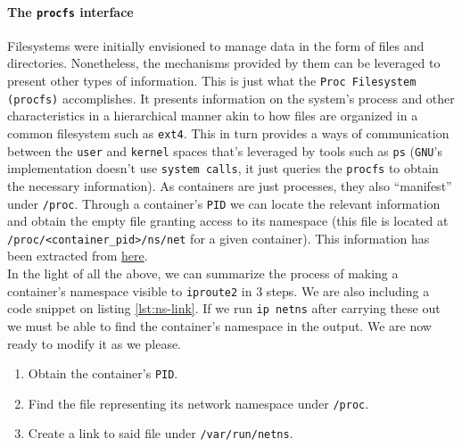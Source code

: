                 \paragraph{The \texttt{procfs} interface}
                    Filesystems were initially envisioned to manage data in the form of files and directories. Nonetheless, the mechanisms provided by them can be leveraged to present other types of information. This is just what the \texttt{Proc Filesystem (procfs)} accomplishes. It presents information on the system's process and other characteristics in a hierarchical manner akin to how files are organized in a common filesystem such as \texttt{ext4}. This in turn provides a ways of communication between the \texttt{user} and \texttt{kernel} spaces that's leveraged by tools such as \texttt{ps} (\texttt{GNU}'s implementation doesn't use \texttt{system calls}, it just queries the \texttt{procfs} to obtain the necessary information). As containers are just processes, they also ``manifest'' under \texttt{/proc}. Through a container's \texttt{PID} we can locate the relevant information and obtain the empty file granting access to its namespace (this file is located at \texttt{/proc/<container\_pid>/ns/net} for a given container). This information has been extracted from \href{https://en.wikipedia.org/wiki/Procfs}{here}.\\

                In the light of all the above, we can summarize the process of making a container's namespace visible to \texttt{iproute2} in $3$ steps. We are also including a code snippet on listing \ref{lst:ns-link}. If we run \texttt{ip netns} after carrying these out we must be able to find the container's namespace in the output. We are now ready to modify it as we please.\\

                \begin{enumerate}
                    \item Obtain the container's \texttt{PID}.
                    \item Find the file representing its network namespace under \texttt{/proc}.
                    \item Create a link to said file under \texttt{/var/run/netns}.
                \end{enumerate}

